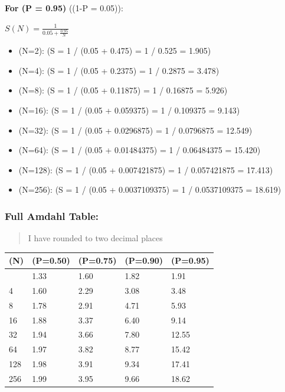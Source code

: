 \documentclass[11pt]{article}
\providecommand{\tightlist}{%
      \setlength{\itemsep}{0pt}\setlength{\parskip}{0pt}}
\begin{document}
\textbf{For (P = 0.95)} ((1-P = 0.05)):

\(S(N) = \frac{1}{0.05 + \frac{0.95}{N}}\)

\begin{itemize}
\tightlist
\item
  (N=2): (S = 1 / (0.05 + 0.475) = 1 / 0.525 = 1.905)
\item
  (N=4): (S = 1 / (0.05 + 0.2375) = 1 / 0.2875 = 3.478)
\item
  (N=8): (S = 1 / (0.05 + 0.11875) = 1 / 0.16875 = 5.926)
\item
  (N=16): (S = 1 / (0.05 + 0.059375) = 1 / 0.109375 = 9.143)
\item
  (N=32): (S = 1 / (0.05 + 0.0296875) = 1 / 0.0796875 = 12.549)
\item
  (N=64): (S = 1 / (0.05 + 0.01484375) = 1 / 0.06484375 = 15.420)
\item
  (N=128): (S = 1 / (0.05 + 0.007421875) = 1 / 0.057421875 = 17.413)
\item
  (N=256): (S = 1 / (0.05 + 0.0037109375) = 1 / 0.0537109375 = 18.619)
\end{itemize}

    \subsubsection{Full Amdahl Table:}\label{full-amdahl-table}

\begin{quote}
I have rounded to two decimal places
\end{quote}

{\def\LTcaptype{none} %
\begin{longtable}[]{@{}lllll@{}}
\toprule\noalign{}
(N) & (P=0.50) & (P=0.75) & (P=0.90) & (P=0.95) \\
\midrule\noalign{}
\endhead
\bottomrule\noalign{}
\endlastfoot
2 & 1.33 & 1.60 & 1.82 & 1.91 \\
4 & 1.60 & 2.29 & 3.08 & 3.48 \\
8 & 1.78 & 2.91 & 4.71 & 5.93 \\
16 & 1.88 & 3.37 & 6.40 & 9.14 \\
32 & 1.94 & 3.66 & 7.80 & 12.55 \\
64 & 1.97 & 3.82 & 8.77 & 15.42 \\
128 & 1.98 & 3.91 & 9.34 & 17.41 \\
256 & 1.99 & 3.95 & 9.66 & 18.62 \\
\end{longtable}
}
\end{document}
